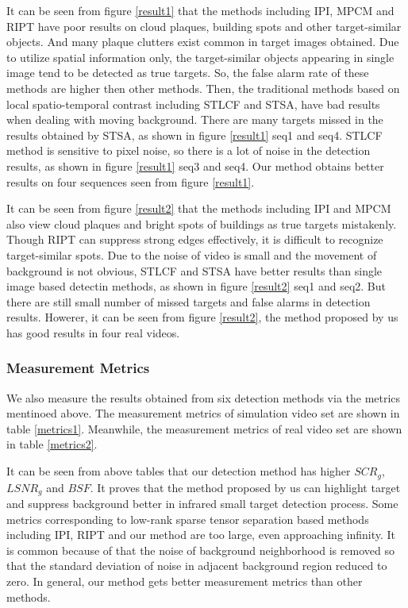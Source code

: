 \documentclass[journal]{IEEEtran}
\begin{document}
It can be seen from figure \ref{result1} that the methods including IPI, MPCM and RIPT have poor results on cloud plaques, building spots and other target-similar objects. And many plaque clutters exist common in target images obtained. Due to utilize spatial information only, the target-similar objects appearing in single image tend to be detected as true targets. So, the false alarm rate of these methods are higher then other methods. Then, the traditional methods based on local spatio-temporal contrast including STLCF and STSA, have bad results when dealing with moving background. There are many targets missed in the results obtained by STSA, as shown in figure \ref{result1} seq1 and seq4. STLCF method is sensitive to pixel noise, so there is a lot of noise in the detection results, as shown in figure \ref{result1} seq3 and seq4. Our method obtains better results on four sequences seen from figure \ref{result1}.

It can be seen from figure \ref{result2} that the methods including IPI and MPCM also view cloud plaques and bright spots of buildings as true targets mistakenly. Though RIPT can suppress strong edges effectively, it is difficult to recognize target-similar spots. Due to the noise of video is small and the movement of background is not obvious, STLCF and STSA have better results than single image based detectin methods, as shown in figure \ref{result2} seq1 and seq2. But there are still small number of missed targets and false alarms in detection results. Howerer, it can be seen from figure \ref{result2}, the method proposed by us has good results in four real videos.





\subsubsection{Measurement Metrics}
We also measure the results obtained from six detection methods via the metrics mentinoed above. The measurement metrics of simulation video set are shown in table \ref{metrics1}. Meanwhile, the measurement metrics of real video set are shown in table \ref{metrics2}.

It can be seen from above tables that our detection method has higher $SCR_g$, $LSNR_g$ and $BSF$. It proves that the method proposed by us can highlight target and suppress background better in infrared small target detection process. Some metrics corresponding to low-rank sparse tensor separation based methods including IPI, RIPT and our method are too large, even approaching infinity. It is common because of that the noise of background neighborhood is removed so that the standard deviation of noise in adjacent background region reduced to zero. In general, our method gets better measurement metrics than other methods.
\end{document}
